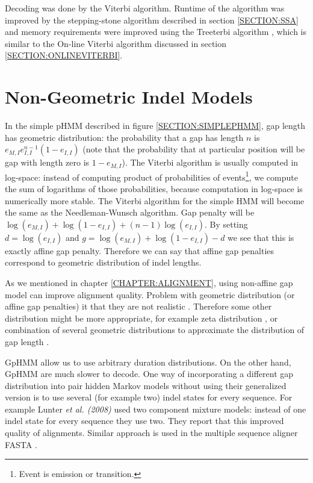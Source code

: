 Decoding was done by the Viterbi algorithm. Runtime of the algorithm was
improved by the stepping-stone algorithm described in section \ref{SECTION:SSA}
and memory requirements were improved using the Treeterbi algorithm
\cite{Keibler2007}, which is similar to the On-line Viterbi algorithm discussed
in section \ref{SECTION:ONLINEVITERBI}.


\section{Non-Geometric Indel Models}
In the simple pHMM described in figure \ref{SECTION:SIMPLEPHMM}, gap length has
geometric distribution: the probability that a gap has length $n$ is
$e_{M,I}e_{I,I}^{n-1}(1-e_{I,I})$ (note that the probability that at particular
position will be gap with length zero is $1-e_{M,I}$). The Viterbi
algorithm is usually computed in log-space: instead of computing product of
probabilities of events\footnote{Event is emission or transition.}, we compute
the sum of logarithms of those probabilities, because computation in log-space
is numerically more stable. The Viterbi algorithm for the simple HMM
will become the same as the Needleman-Wunsch algorithm.  Gap penalty will be
$\log(e_{M,I})+\log(1-e_{I,I})+(n-1)\log(e_{I,I})$. By setting $d=\log(e_{I,I})$
and $g=\log(e_{M,I})+\log(1-e_{I,I})-d$ we see that this is exactly affine gap
penalty. Therefore we can say that affine gap penalties correspond to geometric
distribution of indel lengths.

As we mentioned in chapter \ref{CHAPTER:ALIGNMENT}, using non-affine gap model
can improve alignment quality.  Problem with geometric distribution (or affine
gap penalties) it that they are not realistic \cite{Cartwright2009,Lunter2008}.
Therefore some other distribution might be more appropriate, for example zeta
distribution \cite{Cartwright2009}, or combination of several geometric
distributions to approximate the distribution of gap length
\cite{Gill2004,Gill2006}.

GpHMM allow us to use arbitrary duration distributions.  On the other hand,
GpHMM are much slower to decode.  One way of incorporating a different gap
distribution into pair hidden Markov models without using their generalized
version is to use several (for example two) indel states for every sequence. For
example Lunter {\it et al. (2008)} used two component mixture models: instead of
one indel state for every sequence they use two. They report that this improved
quality of alignments. Similar approach is used in the multiple sequence aligner
FASTA \cite{Bradley2009}. \nocite{Lunter2008}

